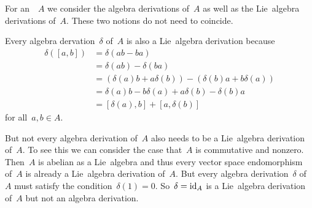 \begin{remark}
  For an~\algebra{$\kf$}~$A$ we consider the algebra derivations of~$A$ as well as the Lie~algebra derivations of~$A$.
  These two notions do not need to coincide.

  Every algebra dervation~$\delta$ of~$A$ is also a Lie~algebra derivation because 
  \begin{align*}
    \delta([a,b])
    &=
    \delta(ab - ba)
    \\
    &=
    \delta(ab) - \delta(ba)
    \\
    &=
    ( \delta(a) b + a \delta(b) ) - ( \delta(b) a + b \delta(a) )
    \\
    &=
    \delta(a) b - b \delta(a) + a \delta(b) - \delta(b) a
    \\
    &=
    [\delta(a), b] + [a, \delta(b)]
  \end{align*}
  for all~$a, b \in A$.

  But not every algebra derivation of~$A$ also needs to be a Lie~algebra derivation of~$A$.
  To see this we can consider the case that~$A$ is commutative and nonzero.
  Then~$A$ is abelian as a Lie~algebra and thus every vector space endomorphism of~$A$ is already a Lie~algebra derivation of~$A$.
  But every algebra derivation~$\delta$ of~$A$ must satisfy the condition~$\delta(1) = 0$.
  So~$\delta = \mathrm{id}_A$ is a Lie~algebra derivation of~$A$ but not an algebra derivation.
\end{remark}


